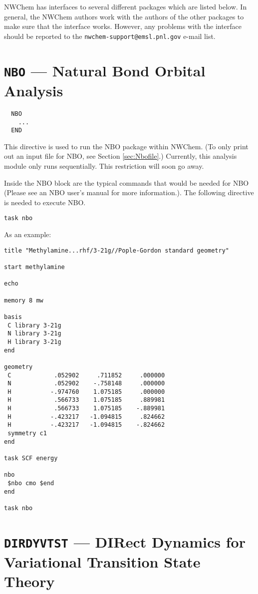 \label{sec:interface}

NWChem has interfaces to several different packages which are listed below.
In general, the NWChem authors work with the authors of the other packages
to make sure that the interface works.  However, any problems with the 
interface should be reported to the
{\tt nwchem-support@emsl.pnl.gov} e-mail list.

\section{{\tt NBO} --- Natural Bond Orbital Analysis}
\label{sec:nbo}
\begin{verbatim}
  NBO
    ...
  END
\end{verbatim}

This directive is used to run the NBO package within NWChem.  (To only print
out an input file for NBO, see Section \ref{sec:Nbofile}.)  Currently, this
analysis module only runs sequentially.  This restriction will soon go away.

Inside the NBO block are the typical commands that would be needed for NBO
(Please see an NBO user's manual for more information.).  The following
directive is needed to execute NBO.
\begin{verbatim}
task nbo
\end{verbatim}
As an example:

\begin{verbatim}
title "Methylamine...rhf/3-21g//Pople-Gordon standard geometry"

start methylamine

echo

memory 8 mw

basis
 C library 3-21g
 N library 3-21g
 H library 3-21g
end

geometry
 C            .052902     .711852     .000000
 N            .052902    -.758148     .000000
 H           -.974760    1.075185     .000000
 H            .566733    1.075185     .889981
 H            .566733    1.075185    -.889981
 H           -.423217   -1.094815     .824662
 H           -.423217   -1.094815    -.824662
 symmetry c1
end

task SCF energy

nbo
 $nbo cmo $end
end

task nbo 

\end{verbatim}

\section{{\tt DIRDYVTST} --- DIRect Dynamics for Variational Transition State Theory}
\label{sec:dirdyvtst}

